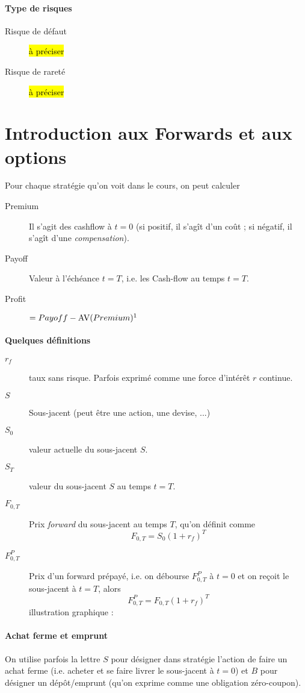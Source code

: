 \documentclass[10pt, french]{article}
\begin{document}
\begin{multicols*}{2}
\paragraph{Type de risques}
\begin{description}
\item[Risque de défaut] \hl{à préciser}
\item[Risque de rareté] \hl{à préciser}
\end{description}

\section{Introduction aux Forwards et aux options}
Pour chaque stratégie qu'on voit dans le cours, on peut calculer
\begin{description}
\item[Premium] Il s'agit des cashflow à $t=0$ (si positif, il s'agît d'un coût ; si négatif, il s'agît d'une \textit{compensation}).
\item[Payoff] Valeur à l'échéance $t = T$, i.e. les Cash-flow au temps $t = T$.
\item[Profit] $= Payoff - \text{AV}(Premium)\footnote{AV veut dire \textit{accumulated value}.}$
\end{description}

\paragraph{Quelques définitions}
\begin{description}
\item[$r_f$] taux sans risque. Parfois exprimé comme une force d'intérêt $r$ continue.
\item[$S$] Sous-jacent (peut être une action, une devise, ...)
\item[$S_0$] valeur actuelle du sous-jacent $S$.
\item[$S_T$] valeur du sous-jacent $S$ au temps $t = T$.
\item[$F_{0,T}$] Prix \textit{forward} du sous-jacent au temps $T$, qu'on définit comme
\[F_{0,T} = S_0 (1 + r_f)^{T}\]
\item[$F_{0,T}^{P}$] Prix d'un forward prépayé, i.e. on débourse $F_{0,T}^{P}$ à $t=0$ et on reçoit le sous-jacent à $t  = T$, alors
\[F_{0,T}^{P} = F_{0,T} (1 + r_f)^{T}\]
illustration graphique : 

\end{description}
\paragraph{Achat ferme et emprunt} On utilise parfois la lettre $S$ pour désigner dans stratégie l'action de faire un achat ferme (i.e. acheter et se faire livrer le sous-jacent à $t=0$) et $B$ pour désigner un dépôt/emprunt (qu'on exprime comme une obligation zéro-coupon).



\end{multicols*}
\end{document}
